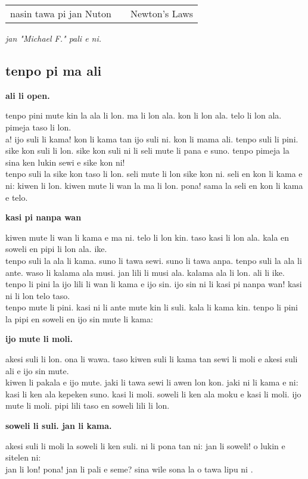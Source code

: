\begin{supertabular}{p{5,5cm}|ll}
    nasin tawa pi jan Nuton &  & Newton's Laws \\
\end{supertabular}

\textit{jan "Michael F."   pali e ni. \cite{www:failbluedot:01}}

\subsection{tenpo pi ma ali}
\textbf{ali li open.}

tenpo pini mute kin la ala li lon. ma li lon ala. kon li lon ala. telo li lon ala. pimeja taso li lon. \\
a! ijo suli li kama! kon li kama tan ijo suli ni. kon li mama ali. tenpo suli li pini. sike kon suli li lon. sike kon suli ni li seli mute li pana e suno. tenpo pimeja la sina ken lukin sewi e sike kon ni!  \\
tenpo suli la sike kon taso li lon. seli mute li lon sike kon ni. seli en kon li kama e ni: kiwen li lon. kiwen mute li wan la ma li lon. pona! sama la seli en kon li kama e telo.

\textbf{kasi pi nanpa wan}

kiwen mute li wan li kama e ma ni. telo li lon kin. taso kasi li lon ala. kala en soweli en pipi li lon ala. ike.  \\
tenpo suli la ala li kama. suno li tawa sewi. suno li tawa anpa. tenpo suli la ala li ante. waso li kalama ala musi. jan lili li musi ala. kalama ala li lon. ali li ike. tenpo li pini la ijo lili li wan li kama e ijo sin. ijo sin ni li kasi pi nanpa wan! kasi ni li lon telo taso.   \\
tenpo mute li pini. kasi ni li ante mute kin li suli. kala li kama kin. tenpo li pini la pipi en soweli en ijo sin mute li kama:

\textbf{ijo mute li moli.}

akesi suli li lon. ona li wawa. taso kiwen suli li kama tan sewi li moli e akesi suli ali e ijo sin mute.  \\
kiwen li pakala e ijo mute. jaki li tawa sewi li awen lon kon. jaki ni li kama e ni: kasi li ken ala kepeken suno. kasi li moli. soweli li ken ala moku e kasi li moli. ijo mute li moli. pipi lili taso en soweli lili li lon.

\textbf{soweli li suli. jan li kama.}

akesi suli li moli la soweli li ken suli. ni li pona tan ni: jan li soweli! o lukin e sitelen ni:  \\
jan li lon! pona! jan li pali e seme? sina wile sona la o tawa lipu ni \cite{www:Pije:01}.

